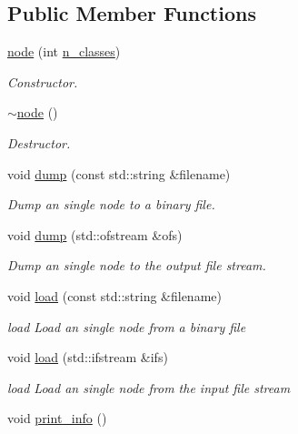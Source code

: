 \subsection*{Public Member Functions}
\begin{DoxyCompactItemize}
\item 
\hyperlink{classnode_a7e5f4a2e917fe20d91d75faf2e9ba5de}{node} (int \hyperlink{classnode_a8c4864582cb3fe15e84e7908d0965150}{n\+\_\+classes})
\begin{DoxyCompactList}\small\item\em Constructor. \end{DoxyCompactList}\item 
\hyperlink{classnode_a482f83436a89f09d289b26144d817adf}{$\sim$node} ()
\begin{DoxyCompactList}\small\item\em Destructor. \end{DoxyCompactList}\item 
void \hyperlink{classnode_a873438b420d0f6d2659a1b25875ed300}{dump} (const std\+::string \&filename)
\begin{DoxyCompactList}\small\item\em Dump an single node to a binary file. \end{DoxyCompactList}\item 
void \hyperlink{classnode_acab00fde3bcc5d44044c39a37313b4eb}{dump} (std\+::ofstream \&ofs)
\begin{DoxyCompactList}\small\item\em Dump an single node to the output file stream. \end{DoxyCompactList}\item 
void \hyperlink{classnode_a6a92c412ae9336cc7ca5f4575a6384c8}{load} (const std\+::string \&filename)
\begin{DoxyCompactList}\small\item\em load Load an single node from a binary file \end{DoxyCompactList}\item 
void \hyperlink{classnode_a6a25c31eb4c3e8c05d5b70b6bd06adff}{load} (std\+::ifstream \&ifs)
\begin{DoxyCompactList}\small\item\em load Load an single node from the input file stream \end{DoxyCompactList}\item 
void \hyperlink{classnode_a95d492b993f2bd1b59c2489e7eb20a13}{print\+\_\+info} ()
\end{DoxyCompactItemize}
